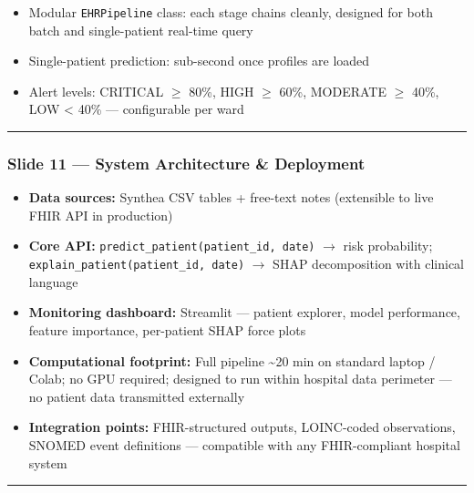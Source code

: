 \documentclass[11pt,a4paper]{article}
\begin{document}
\begin{itemize}
\item Modular \texttt{EHRPipeline} class: each stage chains cleanly, designed for both batch and single-patient real-time query
\item Single-patient prediction: sub-second once profiles are loaded
\item Alert levels: CRITICAL $\geq$ 80\%, HIGH $\geq$ 60\%, MODERATE $\geq$ 40\%, LOW < 40\% --- configurable per ward
\end{itemize}

\noindent\rule{\linewidth}{0.4pt}

\subsubsection{Slide 11 --- System Architecture \& Deployment}
\begin{itemize}
\item \textbf{Data sources:} Synthea CSV tables + free-text notes (extensible to live FHIR API in production)
\item \textbf{Core API:} \texttt{predict\_patient(patient\_id, date)} $\rightarrow$ risk probability; \texttt{explain\_patient(patient\_id, date)} $\rightarrow$ SHAP decomposition with clinical language
\item \textbf{Monitoring dashboard:} Streamlit --- patient explorer, model performance, feature importance, per-patient SHAP force plots
\item \textbf{Computational footprint:} Full pipeline \textasciitilde{}20 min on standard laptop / Colab; no GPU required; designed to run within hospital data perimeter --- no patient data transmitted externally
\item \textbf{Integration points:} FHIR-structured outputs, LOINC-coded observations, SNOMED event definitions --- compatible with any FHIR-compliant hospital system
\end{itemize}

\noindent\rule{\linewidth}{0.4pt}
\end{document}
